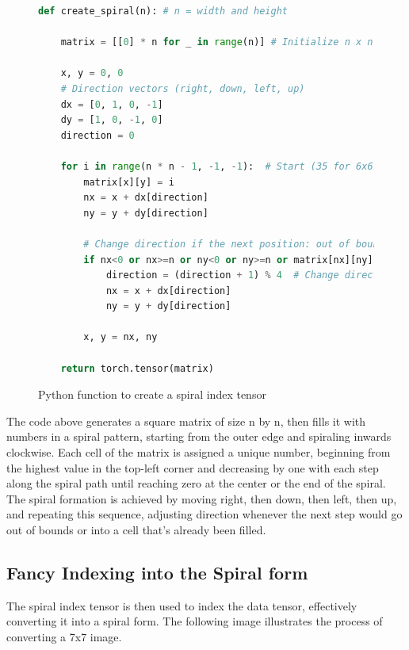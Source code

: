 \begin{figure}[H]
\centering
\begin{lstlisting}[language=Python]
def create_spiral(n): # n = width and height
    
    matrix = [[0] * n for _ in range(n)] # Initialize n x n matrix

    x, y = 0, 0
    # Direction vectors (right, down, left, up)
    dx = [0, 1, 0, -1]
    dy = [1, 0, -1, 0]
    direction = 0

    for i in range(n * n - 1, -1, -1):  # Start (35 for 6x6)
        matrix[x][y] = i
        nx = x + dx[direction]
        ny = y + dy[direction]

        # Change direction if the next position: out of bounds or filled
        if nx<0 or nx>=n or ny<0 or ny>=n or matrix[nx][ny]!=0:
            direction = (direction + 1) % 4  # Change direction
            nx = x + dx[direction]
            ny = y + dy[direction]

        x, y = nx, ny
    
    return torch.tensor(matrix)
\end{lstlisting}
\caption{Python function to create a spiral index tensor}
\label{fig:spiral_matrix}
\end{figure}

    The code above generates a square matrix of size n by n, then fills it with numbers in a spiral pattern, starting from the outer edge and spiraling inwards clockwise. Each cell of the matrix is assigned a unique number, beginning from the highest value in the top-left corner and decreasing by one with each step along the spiral path until reaching zero at the center or the end of the spiral. The spiral formation is achieved by moving right, then down, then left, then up, and repeating this sequence, adjusting direction whenever the next step would go out of bounds or into a cell that's already been filled.


    \subsection{Fancy Indexing into the Spiral form}

    The spiral index tensor is then used to index the data tensor, effectively converting it into a spiral form. The following image illustrates the process of converting a 7x7 image.
    
